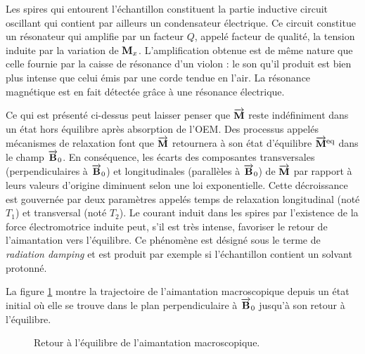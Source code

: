 Les spires qui entourent l'échantillon constituent la partie inductive
circuit oscillant qui contient par ailleurs un condensateur électrique.
Ce circuit constitue un résonateur qui amplifie par un facteur $Q$, appelé
facteur de qualité, la tension induite par la variation de $\mathbf{M}_x$.
L'amplification obtenue est de même nature que celle fournie
par la caisse de résonance d'un violon : le son qu'il produit
est bien plus intense que celui émis par une corde tendue en l'air.
La résonance magnétique est en fait détectée grâce à une résonance électrique.

Ce qui est présenté ci-dessus peut laisser penser que $\overrightarrow{\mathbf{M}}$ reste
indéfiniment dans un état hors équilibre après absorption de l'OEM.
Des processus appelés mécanismes de relaxation font que $\overrightarrow{\mathbf{M}}$
retournera à son état d'équilibre $\overrightarrow{\mathbf{M}}^{\mbox{\footnotesize{eq}}}$ dans le champ $\overrightarrow{\mathbf{B}}_0$.
En conséquence, les écarts des composantes transversales
(perpendiculaires à $\overrightarrow{\mathbf{B}}_0$) et longitudinales
(parallèles à $\overrightarrow{\mathbf{B}}_0$) de $\overrightarrow{\mathbf{M}}$ par
rapport à leurs valeurs d'origine diminuent selon une loi exponentielle.
Cette décroissance est gouvernée par deux paramètres appelés temps de relaxation
longitudinal (noté $T_1$) et transversal (noté $T_2$).
Le courant induit dans les spires par l'existence de la force électromotrice
induite peut, s'il est très intense, favoriser le retour de l'aimantation
vers l'équilibre.
Ce phénomène est désigné sous le terme de \emph{radiation damping}
et est produit par exemple si l'échantillon contient un solvant protonné.

La figure \ref{fig:retour} montre la trajectoire de l'aimantation
macroscopique depuis un état initial où elle se trouve
dans le plan perpendiculaire à $\overrightarrow{\mathbf{B}}_0$
jusqu'à son retour à l'équilibre.

\begin{figure}[hbt]
\begin{center}
\end{center}
\caption{Retour à l'équilibre de l'aimantation macroscopique.}
\label{fig:retour}
\end{figure}

